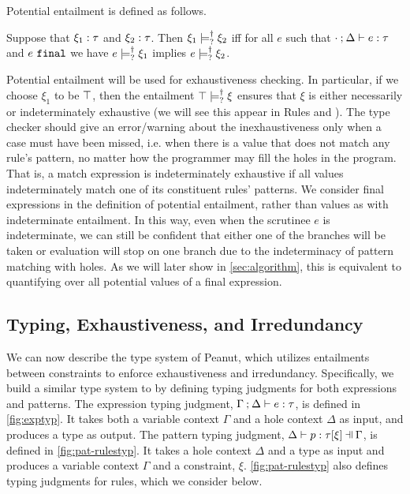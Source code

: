 Potential entailment is defined as follows.
\begin{definition}
  \label{definition:nn-entailment}
  Suppose that $\xi_1 : \tau$ and $\xi_2 : \tau$. Then $\xi_1 \models_{?}^{\dag} \xi_2$ iff for all $e$ such that $\cdot \mathbin{;} \Delta \vdash e : \tau$ and $e ~\mathtt{final}$ we have $e \models_{?}^{\dag} \xi_1$ implies $e \models_{?}^{\dag} \xi_2$.
\end{definition}
Potential entailment will be used for exhaustiveness checking. In particular, if we choose $\xi_1$ to be $\top$, then the entailment $\top \models_{?}^{\dag} \xi$ ensures that $\xi$ is either necessarily or indeterminately exhaustive (we will see this appear in Rules \TMatchZPre and \TMatchNZPre). 
The type checker should give an error/warning about the inexhaustiveness only when a case must have been missed, i.e. when there is a value that does not match any rule's pattern, no matter how the programmer may fill the holes in the program. That is, a match expression is indeterminately exhaustive if all values indeterminately match one of its constituent rules' patterns.
We consider final expressions in the definition of potential entailment, rather than values as with indeterminate entailment. 
In this way, even when the scrutinee $e$ is indeterminate, we can still be confident that either one of the branches will be taken or evaluation will stop on one branch due to the indeterminacy of pattern matching with holes. As we will later show in \autoref{sec:algorithm}, this is equivalent to quantifying over all potential values of a final expression.


\subsection{Typing, Exhaustiveness, and Irredundancy}\label{sec:statics}



We can now describe the type system of Peanut, which utilizes entailments between constraints to enforce exhaustiveness and irredundancy.
  Specifically, we build a similar type system to
\citet{DBLP:journals/pacmpl/OmarVCH19} by defining typing judgments for both
expressions and patterns. The expression typing judgment, $\Gamma \mathbin{;} \Delta \vdash e : \tau$, is defined in \autoref{fig:exptyp}. It takes both a variable context $\Gamma$ and a hole context $\Delta$ as input, and produces a type as output. The pattern typing judgment, $\chpattyp{p}{\tau}{\xi}{\Gamma}{\Delta}$, is defined in \autoref{fig:pat-rulestyp}. It takes a hole context $\Delta$ and a type as input and produces a variable context $\Gamma$ and a constraint, $\xi$. \autoref{fig:pat-rulestyp} also defines typing judgments for rules, which we consider below.

